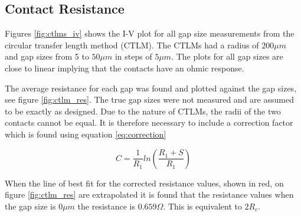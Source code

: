 \subsection{Contact Resistance}
\label{sec:test:contact}




%

Figures \ref{fig:ctlms_iv} shows the I-V plot for all gap size measurements from the circular transfer length method (CTLM). The CTLMs had a radius of $200\mu m$ and gap sizes from 5 to $50\mu m$ in steps of $5\mu m$. The plots for all gap sizes are close to linear implying that the contacts have an ohmic response.

The average resistance for each gap was found and plotted against the gap sizes, see figure \ref{fig:ctlm_res}. The true gap sizes were not measured and are assumed to be exactly as designed. Due to the nature of CTLMs, the radii of the two contacts cannot be equal. It is therefore necessary to include a correction factor which is found using equation \ref{eq:correction}

\begin{equation}
  C = \frac{1}{R_1}ln(\frac{R_1 + S}{R_1})
  \label{eq:correction}
\end{equation}

When the line of best fit for the corrected resistance values, shown in red, on figure \ref{fig:ctlm_res} are extrapolated it is found that the resistance values when the gap size is $0\mu m$ the resistance is $0.659\Omega$. This is equivalent to $2R_c$.
